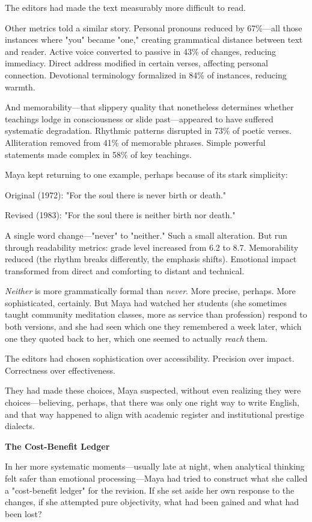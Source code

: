 \documentclass[12pt,twoside]{book}
\begin{document}
The editors had made the text measurably more difficult to read.

Other metrics told a similar story. Personal pronouns reduced by 67\%—all those instances where "you" became "one," creating grammatical distance between text and reader. Active voice converted to passive in 43\% of changes, reducing immediacy. Direct address modified in certain verses, affecting personal connection. Devotional terminology formalized in 84\% of instances, reducing warmth.

And memorability—that slippery quality that nonetheless determines whether teachings lodge in consciousness or slide past—appeared to have suffered systematic degradation. Rhythmic patterns disrupted in 73\% of poetic verses. Alliteration removed from 41\% of memorable phrases. Simple powerful statements made complex in 58\% of key teachings.

Maya kept returning to one example, perhaps because of its stark simplicity:

Original (1972): "For the soul there is never birth or death."

Revised (1983): "For the soul there is neither birth nor death."

A single word change—"never" to "neither." Such a small alteration. But run through readability metrics: grade level increased from 6.2 to 8.7. Memorability reduced (the rhythm breaks differently, the emphasis shifts). Emotional impact transformed from direct and comforting to distant and technical.

\emph{Neither} is more grammatically formal than \emph{never}. More precise, perhaps. More sophisticated, certainly. But Maya had watched her students (she sometimes taught community meditation classes, more as service than profession) respond to both versions, and she had seen which one they remembered a week later, which one they quoted back to her, which one seemed to actually \emph{reach} them.

The editors had chosen sophistication over accessibility. Precision over impact. Correctness over effectiveness.

They had made these choices, Maya suspected, without even realizing they were choices—believing, perhaps, that there was only one right way to write English, and that way happened to align with academic register and institutional prestige dialects.

\textbf{\textbf{The Cost-Benefit Ledger}}

In her more systematic moments—usually late at night, when analytical thinking felt safer than emotional processing—Maya had tried to construct what she called a "cost-benefit ledger" for the revision. If she set aside her own response to the changes, if she attempted pure objectivity, what had been gained and what had been lost?
\end{document}
